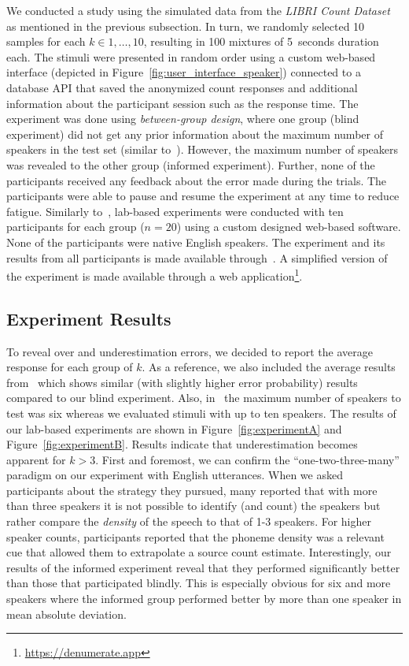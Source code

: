 We conducted a study using the simulated data from the \emph{LIBRI Count Dataset} as mentioned in the previous subsection.
In turn, we randomly selected 10 samples for each \(k \in {1, \ldots, 10}\), resulting in 100 mixtures of 5~seconds duration each.
The stimuli were presented in random order using a custom web-based interface (depicted in Figure~\ref{fig:user_interface_speaker}) connected to a database API that saved the anonymized count responses and additional information about the participant session such as the response time.
The experiment was done using \emph{between-group design}, where one group (blind experiment) did not get any prior information about the maximum number of speakers in the test set (similar to~\cite{kawashima15}).
However, the maximum number of speakers was revealed to the other group (informed experiment).
Further, none of the participants received any feedback about the error made during the trials.
The participants were able to pause and resume the experiment at any time to reduce fatigue.
Similarly to~\cite{kawashima15}, lab-based experiments were conducted with ten participants for each group (\(n=20\)) using a custom designed web-based software.
None of the participants were native English speakers.
The experiment and its results from all participants is made available through~\cite{oss_countit}.
A simplified version of the experiment is made available through a web application\footnote{\url{https://denumerate.app}}.

\subsection{Experiment Results}
To reveal over and underestimation errors, we decided to report the average response for each group of \(k\).
As a reference, we also included the average results from~\cite[Experiment 1, 5~seconds duration]{kawashima15} which shows similar (with slightly higher error probability) results compared to our blind experiment.
Also, in~\cite{kawashima15} the maximum number of speakers to test was six whereas we evaluated stimuli with up to ten speakers.
The results of our lab-based experiments are shown in Figure~\ref{fig:experimentA} and Figure~\ref{fig:experimentB}.
Results indicate that underestimation becomes apparent for \(k > 3\).
First and foremost, we can confirm the ``one-two-three-many'' paradigm on our experiment with English utterances.
When we asked participants about the strategy they pursued, many reported that with more than three speakers it is not possible to identify (and count) the speakers but rather compare the \emph{density} of the speech to that of 1-3 speakers.
For higher speaker counts, participants reported that the phoneme density was a relevant cue that allowed them to extrapolate a source count estimate.
Interestingly, our results of the informed experiment reveal that they performed significantly better than those that participated blindly.
This is especially obvious for six and more speakers where the informed group performed better by more than one speaker in mean absolute deviation.

